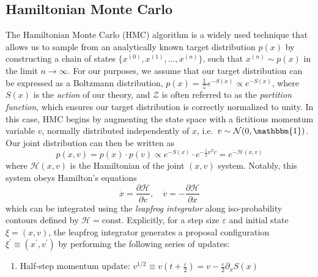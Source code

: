 \documentclass{article} %
\begin{document}
{\subsection{\label{subsec:HMC}Hamiltonian Monte Carlo}
%
The Hamiltonian Monte Carlo (HMC) algorithm is a widely used technique that allows us to sample from an analytically
known target distribution \(p(x)\) by constructing a chain of states \(\{x^{(0)},
x^{(1)}, \ldots, x^{(n)}\}\), such that \(x^{(n)}\sim p(x)\) in the limit
\(n\rightarrow\infty\).
%
For our purposes, we assume that our target distribution can be expressed as a Boltzmann distribution, \(p(x) =
\tfrac{1}{\mathcal{Z}} e^{-S(x)}\propto e^{-S(x)}\), where \(S(x)\) is the \emph{action} of our
theory, and \(\mathcal{Z}\) is often referred to as the \emph{partition function}, which ensures our target distribution
is correctly normalized to unity.
%
In this case, HMC begins by augmenting the state space with a fictitious momentum variable \(v\), normally
distributed independently of \(x\), i.e.\ \(v\sim\mathcal{N}(0, \mathbbm{1})\).
%
Our joint distribution can then be written as
%
\begin{equation}
   p(x, v) = p(x)\cdot p(v) \propto e^{-S(x)}\cdot e^{-\frac{1}{2}v^{T}v} = e^{-\mathcal{H}(x, v)}
\end{equation}
%
where \(\mathcal{H}(x, v)\) is the Hamiltonian of the joint \((x, v)\) system.
%
Notably, this system obeys Hamilton's equations
%
\begin{equation}
   \dot{x} = \frac{\partial\mathcal{H}}{\partial v},\quad \dot{v} = -\frac{\partial\mathcal{H}}{\partial x}
\end{equation}
%
which can be integrated using the \emph{leapfrog integrator} along iso-probability contours defined by \(\mathcal{H} =
\text{const}\).
%
Explicitly, for a step size \(\varepsilon\) and initial state \(\xi = (x, v)\), the leapfrog integrator generates a
proposal configuration \(\xi^{\prime} \equiv (x^{\prime}, v^{\prime})\) by performing the following series of updates: 
%
\begin{enumerate}
   \item Half-step momentum update: \hspace{12pt}\(%
      v^{1/2} \equiv v{\left(t+\frac{\varepsilon}{2}\right)} = v-\frac{\varepsilon}{2}\partial_{x}S(x)
   \)

\end{enumerate}}
\end{document}
